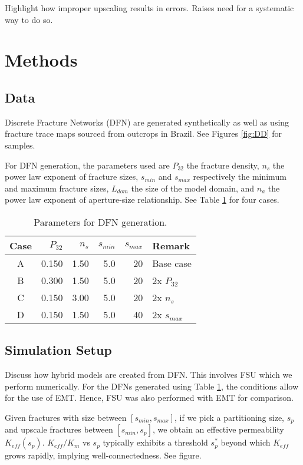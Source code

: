 \documentclass[a4paper]{article}
\begin{document}
Highlight how improper upscaling results in errors. Raises need for a systematic way to do so.

\section{Methods}
\subsection{Data}
Discrete Fracture Networks (DFN) are generated synthetically as well as using fracture trace maps sourced from outcrops in Brazil. See Figures \ref{fig:DD} for samples.

For DFN generation, the parameters used are $P_{32}$ the fracture density, $n_s$ the power law exponent of fracture sizes, $s_{min}$ and $s_{max}$ respectively the minimum and maximum fracture sizes, $L_{dom}$ the size of the model domain, and $n_a$ the power law exponent of aperture-size relationship. See Table \ref{table:DFNparams} for four cases.

\begin{table}[h]
	\centering
	\caption{Parameters for DFN generation.}
	
	\begin{tabular}{c r r r r l}
		Case & $P_{32}$ & $n_s$ & $s_{min}$ & $s_{max}$ & Remark \\
		\hline
		A & 0.150 & 1.50 & 5.0 & 20 & Base case\\
		B & 0.300 & 1.50 & 5.0 & 20 & 2x $P_{32}$\\
		C & 0.150 & 3.00 & 5.0 & 20 & 2x $n_s$\\
		D & 0.150 & 1.50 & 5.0 & 40 & 2x $s_{max}$\\
		
	\end{tabular}
	\label{table:DFNparams}
\end{table}



\subsection{Simulation Setup}
Discuss how hybrid models are created from DFN. This involves FSU which we perform numerically. For the DFNs generated using Table \ref{table:DFNparams}, the conditions allow for the use of EMT. Hence, FSU was also performed with EMT for comparison.

Given fractures with size between $[s_{min},s_{max}]$, if we pick a partitioning size, $s_p$ and upscale fractures between $[s_{min},s_p]$, we obtain an effective permeability $K_{eff}(s_p)$. $K_{eff}/K_m$ vs $s_p$ typically exhibits a threshold $s_p^*$ beyond which $K_{eff}$ grows rapidly, implying well-connectedness. See figure.
\end{document}
